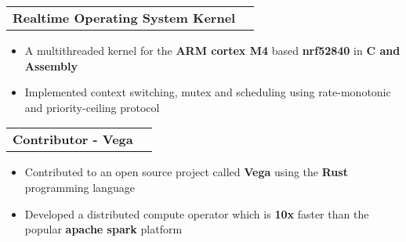 \documentclass[12pt]{article}
\makeatletter
\newcommand{\resumeItem}[1]{
  \item\small{
    {#1}
  } 
  \vspace{-3pt}
}
\newcommand{\resumeProjectHeading}[2]{

    \vspace{-1pt}\item
    \begin{tabular*}{0.97\textwidth}[t]{l@{\extracolsep{\fill}}r}
      \small#1 & \small#2 \\ 
    \end{tabular*}
}
\newcommand{\resumeItemListStart}{\begin{itemize}\vspace{-8pt}}
\newcommand{\resumeItemListEnd}{\end{itemize}\vspace{-8pt}}
\makeatother
\begin{document}
         
        \resumeProjectHeading            
          {\textbf{Realtime Operating System Kernel}}{}
            \resumeItemListStart
              \resumeItem{A multithreaded kernel for the \textbf{ARM cortex M4} based \textbf{nrf52840} in \textbf{C and Assembly}}
              \resumeItem{Implemented context switching, mutex and scheduling using rate-monotonic and priority-ceiling protocol}
              \resumeItemListEnd 
    
        \resumeProjectHeading       
          {\textbf{Contributor -  Vega}}{}
            \resumeItemListStart
              \resumeItem{Contributed to an open source project called \textbf{Vega} using the \textbf{Rust} programming language}
              \resumeItem{Developed a distributed compute operator which is \textbf{10x} faster than the popular \textbf{apache spark} platform}
            \resumeItemListEnd








  
\end{document}
